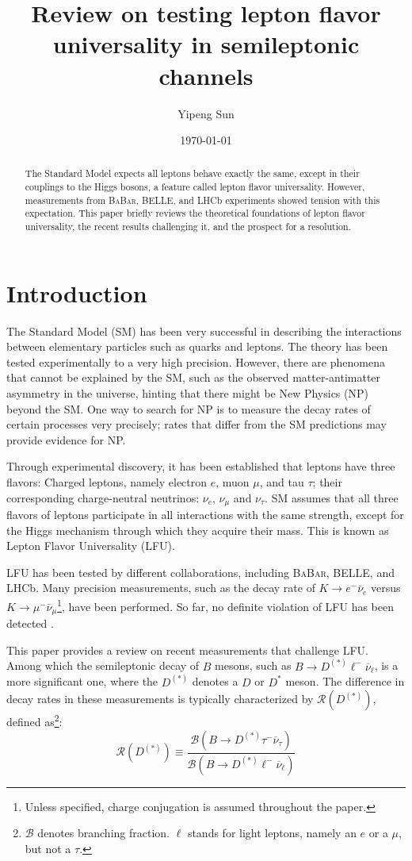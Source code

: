 \documentclass[12pt,letterpaper]{article}
\title{Review on testing lepton flavor universality in semileptonic channels}
\author{Yipeng Sun}
\affil{Department of Physics, University of Maryland}
\date{\today}
\def\BaBar/{\textsc{BaBar}}
\def\RDDst/{\ensuremath{\mathcal{R}(D^{(*)})}}
\def\DDst/{\ensuremath{D^{(*)}}}
\def\Dst/{\ensuremath{D^*}}
\newcommand{\BMesonMode}[2]{\ensuremath{
    B \rightarrow #2 #1^- \overline{\nu}_#1
}}
\newcommand{\BDDstMode}[1]{\BMesonMode{#1}{\DDst/}}
\begin{document}
\maketitle

\begin{abstract}
    The Standard Model expects all leptons behave exactly the same, except in
    their couplings to the Higgs bosons, a feature called lepton flavor
    universality.
    However, measurements from \BaBar/, BELLE, and LHCb experiments showed
    tension with this expectation.
    This paper briefly reviews the theoretical foundations of lepton flavor
    universality, the recent results challenging it, and the prospect for a
    resolution.
\end{abstract}

\section{Introduction}
The Standard Model (SM) has been very successful in describing the interactions
between elementary particles such as quarks and leptons.
The theory has been tested experimentally to a very high precision.
However, there are phenomena that cannot be explained by the SM, such as
the observed matter-antimatter asymmetry in the universe, hinting that there
might be New Physics (NP) beyond the SM.
One way to search for NP is to measure the decay rates of certain processes
very precisely;
rates that differ from the SM predictions may provide evidence for NP.

Through experimental discovery, it has been established that leptons have three
flavors:
Charged leptons, namely electron $e$, muon $\mu$, and tau $\tau$;
their corresponding charge-neutral neutrinos: $\nu_e$, $\nu_\mu$ and $\nu_\tau$.
SM assumes that all three flavors of leptons participate in all
interactions with the same strength, except for the Higgs mechanism through
which they acquire their mass.
This is known as Lepton Flavor Universality (LFU).

LFU has been tested by different collaborations, including \BaBar/, BELLE, and
LHCb.
Many precision measurements, such as the decay rate
of $K \rightarrow e^- \bar{\nu}_e$ versus
$K \rightarrow \mu^- \bar{\nu}_\mu$\footnote{
    Unless specified, charge conjugation is assumed throughout the paper.
}, have been performed.
So far, no definite violation of LFU has been detected \cite{Ciezarek:2017yzh}.

This paper provides a review on recent measurements that challenge LFU.
Among which the semileptonic decay of $B$ mesons, such as
\BDDstMode{\ell}, is a more significant one, where the \DDst/ denotes a $D$
or \Dst/ meson.
The difference in decay rates in these measurements is typically characterized
by \RDDst/, defined as\footnote{
    $\mathcal{B}$ denotes branching fraction.
    $\ell$ stands for light leptons, namely an $e$ or a $\mu$, but not a $\tau$.
}:
\begin{equation}
    \RDDst/ \equiv \frac{
        \mathcal{B}\left( \BDDstMode{\tau} \right)
    }{
        \mathcal{B}\left( \BDDstMode{\ell} \right)
    }
\end{equation}
\end{document}
